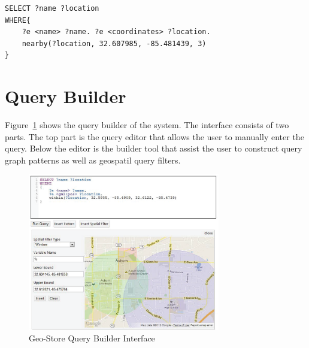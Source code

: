 \begin{verbatim}
SELECT ?name ?location
WHERE{
    ?e <name> ?name. ?e <coordinates> ?location.
    nearby(?location, 32.607985, -85.481439, 3)
}
\end{verbatim}

\section{Query Builder}

Figure~\ref{fig:geostore_web} shows the query builder of the system. The interface consists of two parts. The top part is the query editor that allows the user to manually enter the query. Below the editor is the builder tool that assist the user to construct query graph patterns as well as geospatil query filters.

\begin{figure}[t]
\centering
\includegraphics[width=3.3in]{images/geostore_web.eps}
\caption{Geo-Store Query Builder Interface}\label{fig:geostore_web}
\end{figure} 